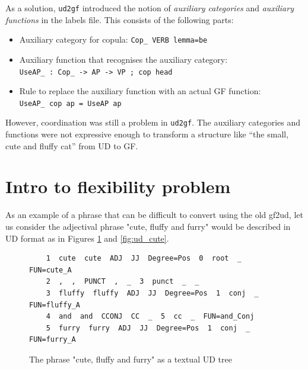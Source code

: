 As a solution, \verb|ud2gf| introduced the notion of \emph{auxiliary categories} and \emph{auxiliary functions} in the labels file. This consists of the following parts:
\begin{itemize}
    \item Auxiliary category for copula: \verb|Cop_ VERB lemma=be|
    \item Auxiliary function that recognises the auxiliary category: \\
           \verb|UseAP_ : Cop_ -> AP -> VP ; cop head|
    \item Rule to replace the auxiliary function with an actual GF function: \\
          \verb|UseAP_ cop ap = UseAP ap|
\end{itemize}

However, coordination was still a problem in \verb|ud2gf|. The auxiliary categories and functions were not expressive enough to transform a structure like “the small, cute and fluffy cat” from UD to GF.





\section{Intro to flexibility problem}

As an example of a phrase that can be difficult to convert using the old gf2ud, let us consider the adjectival phrase "cute, fluffy and furry"
would be described in UD format as in Figures \ref{fig:ud_cute_text} and \ref{fig:ud_cute}.


\begin{figure}
    \begin{verbatim}
    1  cute  cute  ADJ  JJ  Degree=Pos  0  root  _  FUN=cute_A
    2  ,  ,  PUNCT  ,  _  3  punct  _  _
    3  fluffy  fluffy  ADJ  JJ  Degree=Pos  1  conj  _  FUN=fluffy_A
    4  and  and  CCONJ  CC  _  5  cc  _  FUN=and_Conj
    5  furry  furry  ADJ  JJ  Degree=Pos  1  conj  _  FUN=furry_A
    \end{verbatim}
    \caption{The phrase "cute, fluffy and furry" as a textual UD tree}
    \label{fig:ud_cute_text}
\end{figure}

